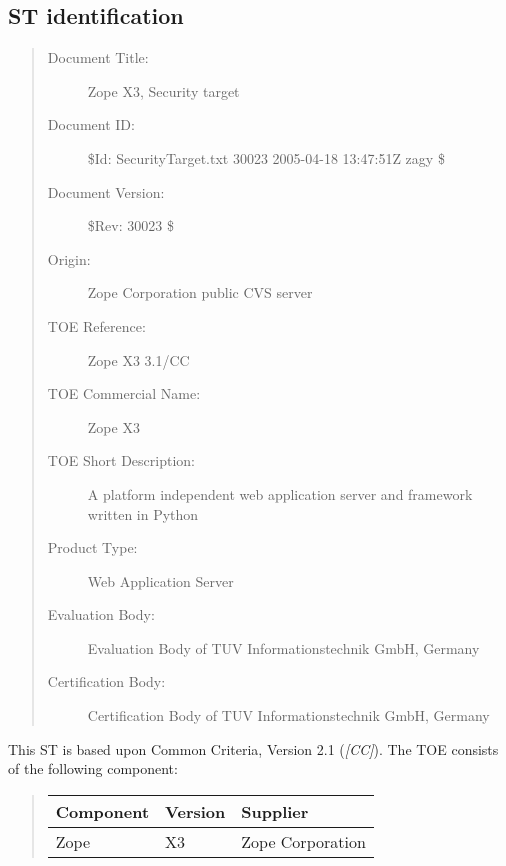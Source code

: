 \documentclass[10pt,a4paper,english]{article}
\newlength{\locallinewidth}
\begin{document}
\hypertarget{st-identification}{}
\subsection*{ST identification}
\begin{quote}
\begin{description}
\item [Document Title:]
Zope X3, Security target


\item [Document ID:]
{\$}Id: SecurityTarget.txt 30023 2005-04-18 13:47:51Z zagy {\$}


\item [Document Version:]
{\$}Rev: 30023 {\$}


\item [Origin:]
Zope Corporation public CVS server


\item [TOE Reference:]
Zope X3 3.1/CC


\item [TOE Commercial Name:]
Zope X3


\item [TOE Short Description:]
A platform independent web application server and framework written in Python


\item [Product Type:]
Web Application Server


\item [Evaluation Body:]
Evaluation Body of TUV Informationstechnik GmbH, Germany


\item [Certification Body:]
Certification Body of TUV Informationstechnik GmbH, Germany


\end{description}
\end{quote}

This ST is based upon Common Criteria, Version 2.1 (\emph{{[}CC]}).
The TOE consists of the following component:
\begin{quote}

\begin{longtable}[c]{|p{0.14\locallinewidth}|p{0.13\locallinewidth}|p{0.20\locallinewidth}|}
\hline
\textbf{
Component
} & \textbf{
Version
} & \textbf{
Supplier
} \\
\hline
\endhead

Zope
 & 
X3
 & 
Zope Corporation
 \\
\hline
\end{longtable}
\end{quote}
\end{document}
